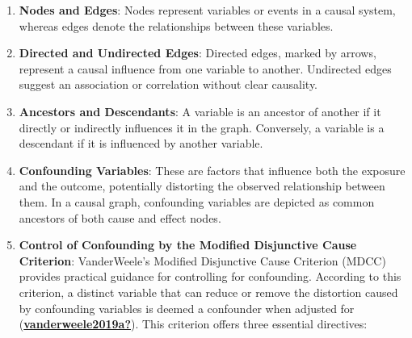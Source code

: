 \documentclass[
  singlecolumn]{report}
\begin{document}
\begin{enumerate}
\def\labelenumi{\arabic{enumi}.}
\item
  \textbf{Nodes and Edges}: Nodes represent variables or events in a
  causal system, whereas edges denote the relationships between these
  variables.
\item
  \textbf{Directed and Undirected Edges}: Directed edges, marked by
  arrows, represent a causal influence from one variable to another.
  Undirected edges suggest an association or correlation without clear
  causality.
\item
  \textbf{Ancestors and Descendants}: A variable is an ancestor of
  another if it directly or indirectly influences it in the graph.
  Conversely, a variable is a descendant if it is influenced by another
  variable.
\item
  \textbf{Confounding Variables}: These are factors that influence both
  the exposure and the outcome, potentially distorting the observed
  relationship between them. In a causal graph, confounding variables
  are depicted as common ancestors of both cause and effect nodes.
\item
  \textbf{Control of Confounding by the Modified Disjunctive Cause
  Criterion}: VanderWeele's Modified Disjunctive Cause Criterion (MDCC)
  provides practical guidance for controlling for confounding. According
  to this criterion, a distinct variable that can reduce or remove the
  distortion caused by confounding variables is deemed a confounder when
  adjusted for
  (\protect\hyperlink{ref-vanderweele2019a}{\textbf{vanderweele2019a?}}).
  This criterion offers three essential directives:


\end{enumerate}
\end{document}
